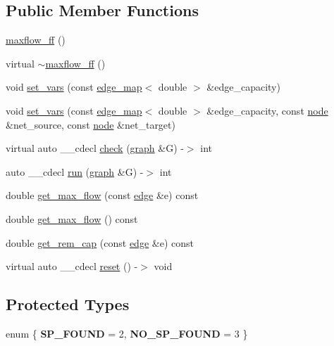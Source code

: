 \subsection*{Public Member Functions}
\begin{DoxyCompactItemize}
\item 
\mbox{\hyperlink{classmaxflow__ff_a47280ecd91e227e529455249ee390ca3}{maxflow\+\_\+ff}} ()
\item 
virtual \mbox{\hyperlink{classmaxflow__ff_ae1c3c5ba0b8c55cdba429ee906bce7d9}{$\sim$maxflow\+\_\+ff}} ()
\item 
void \mbox{\hyperlink{classmaxflow__ff_ad2485a4c093dbcfa045d1e6e5d78f533}{set\+\_\+vars}} (const \mbox{\hyperlink{classedge__map}{edge\+\_\+map}}$<$ double $>$ \&edge\+\_\+capacity)
\item 
void \mbox{\hyperlink{classmaxflow__ff_a1e715030d70080e0c9ecf118dd81e8f6}{set\+\_\+vars}} (const \mbox{\hyperlink{classedge__map}{edge\+\_\+map}}$<$ double $>$ \&edge\+\_\+capacity, const \mbox{\hyperlink{classnode}{node}} \&net\+\_\+source, const \mbox{\hyperlink{classnode}{node}} \&net\+\_\+target)
\item 
virtual auto \+\_\+\+\_\+cdecl \mbox{\hyperlink{classmaxflow__ff_ac1ae43b4e24d9b433892c073c8b244d3}{check}} (\mbox{\hyperlink{classgraph}{graph}} \&G) -\/$>$ int
\item 
auto \+\_\+\+\_\+cdecl \mbox{\hyperlink{classmaxflow__ff_a0060613409391c3a6d7e6fe473af21f1}{run}} (\mbox{\hyperlink{classgraph}{graph}} \&G) -\/$>$ int
\item 
double \mbox{\hyperlink{classmaxflow__ff_a4c120a7ea9be23d908036ebd2fb9298c}{get\+\_\+max\+\_\+flow}} (const \mbox{\hyperlink{classedge}{edge}} \&e) const
\item 
double \mbox{\hyperlink{classmaxflow__ff_a04d1ea509c13e500b62cad061ee8a2b9}{get\+\_\+max\+\_\+flow}} () const
\item 
double \mbox{\hyperlink{classmaxflow__ff_a3b66acf996ff5be94de8b2cfdb3164c3}{get\+\_\+rem\+\_\+cap}} (const \mbox{\hyperlink{classedge}{edge}} \&e) const
\item 
virtual auto \+\_\+\+\_\+cdecl \mbox{\hyperlink{classmaxflow__ff_ab9fcde7ee97a160c2be797d35c2a3204}{reset}} () -\/$>$ void
\end{DoxyCompactItemize}
\subsection*{Protected Types}
\begin{DoxyCompactItemize}
\item 
\mbox{\label{classmaxflow__ff_a08dc6e5c5fe20a9f9d93721f8c273592}} 
enum \{ {\bfseries S\+P\+\_\+\+F\+O\+U\+ND} = 2, 
{\bfseries N\+O\+\_\+\+S\+P\+\_\+\+F\+O\+U\+ND} = 3
 \}
\end{DoxyCompactItemize}
